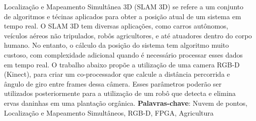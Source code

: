 
\setlength{\absparsep}{18pt} %
\begin{resumo}
	Localização e Mapeamento Simultânea 3D (SLAM 3D) se refere a um conjunto de algoritmos e técinas aplicados para obter a posição atual de um sistema em tempo real. O SLAM 3D tem diversas aplicações, como carros autônomos, veículos aéreos não tripulados, robôs agricultores, e até atuadores dentro do corpo humano. No entanto, o cálculo da posição do sistema tem algoritmo muito custoso, com complexidade adicional quando é necessário processar esses dados em tempo real. O trabalho abaixo propõe a utilização de uma camera RGB-D (Kinect), para criar um co-processador que calcule a distância percorrida e ângulo de giro entre frames dessa câmera. Esses parâmetros poderão ser utilizados posteriormente para a utilização de um robô que detecta e elimina ervas daninhas em uma plantação orgânica.
	\vspace{\onelineskip}
	\noindent 
	\textbf{Palavras-chave}: Nuvem de pontos, Localização e Mapeamento Simultâneos, RGB-D, FPGA, Agricultura
\end{resumo}

\begin{comment}
\begin{resumo}[Abstract]
	\begin{otherlanguage*}{english}
		Resumo em ingles
		
		\vspace{\onelineskip}
		\noindent 
		\textbf{Keywords}: keyword 1.
	\end{otherlanguage*}
\end{resumo}
\end{comment}